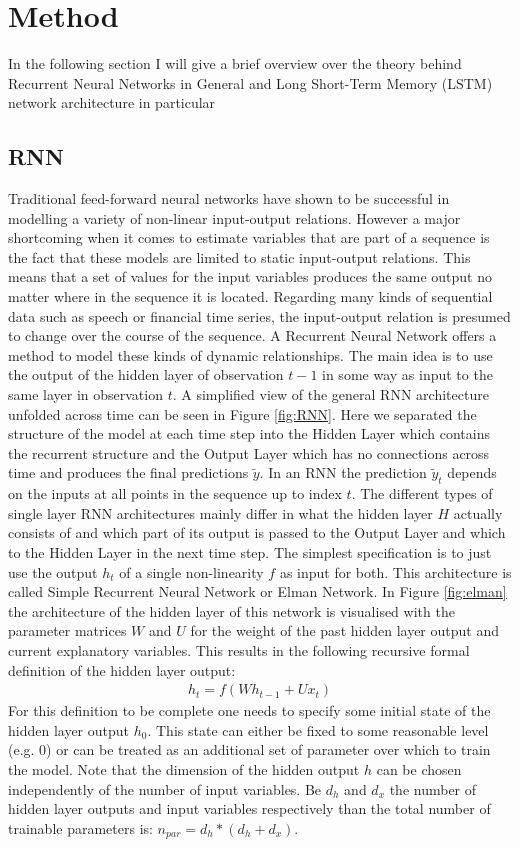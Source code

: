 \chapter{Method}\label{Sec:Method}
In the following section I will give a brief overview over the theory behind Recurrent Neural Networks in General and Long Short-Term Memory (LSTM) network architecture in particular
\section{RNN}
Traditional feed-forward neural networks have shown to be successful in modelling a variety of non-linear input-output relations. However a major shortcoming when it comes to estimate variables that are part of a sequence is the fact that these models are limited to static input-output relations. This means that a set of values for the input variables produces the same output no matter where in the sequence it is located. Regarding many kinds of sequential data such as speech or financial time series, the input-output relation is presumed to change over the course of the sequence. A Recurrent Neural Network offers a method to model these kinds of dynamic relationships. The main idea is to use the output of the hidden layer of observation $t-1$ in some way as input to the same layer in observation $t$. A simplified view of the general RNN architecture unfolded across time can be seen in Figure \ref{fig:RNN}. Here we separated the structure of the model at each time step into the Hidden Layer which contains the recurrent structure and the Output Layer which has no connections across time and produces the final predictions $\tilde{y}$. In an RNN the prediction $\tilde{y}_t$ depends on the inputs at all points in the sequence up to index $t$.
The different types of single layer RNN architectures mainly differ in what the hidden layer $H$ actually consists of and which part of its output is passed to the Output Layer and which to the Hidden Layer in the next time step. The simplest specification is to just use the output $h_t$ of a single non-linearity $f$  as input for both. This architecture is called Simple Recurrent Neural Network or Elman Network. In Figure \ref{fig:elman} the architecture of the hidden layer of this network is visualised with the parameter matrices $W$ and $U$ for the weight of the past hidden layer output and current explanatory variables. This results in the following recursive formal definition of the hidden layer output:
\begin{align*}
h_t = f(Wh_{t-1} + Ux_t)
\end{align*}
For this definition to be complete one needs to specify some initial state of the hidden layer output $h_0$. This state can either be fixed to some reasonable level (e.g. 0) or can be treated as an additional set of parameter over which to train the model.
Note that the dimension of the hidden output $h$ can be chosen independently of the number of input variables. Be $d_h$ and $d_x$ the number of hidden layer outputs and input variables respectively than the total number of trainable parameters is: $n_{par} = d_h * (d_h + d_x)$.

